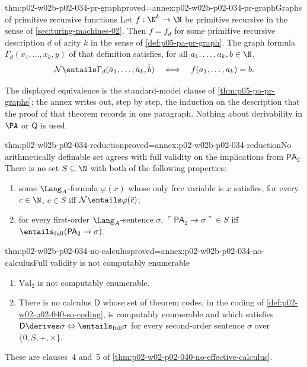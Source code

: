 \begin{hblemma}{thm:p02-w02b-p02-034-pr-graph}{proved=annex:p02-w02b-p02-034-pr-graph}{Graphs of primitive recursive functions}
Let \(f:\N^k\to\N\) be primitive recursive in the sense of
\cref{sec:turing-machines-02}.  Then \(f=f_d\) for some primitive recursive
description \(d\) of arity \(k\) in the sense of \cref{def:p05-pa-pr-graph}.
The graph formula \(\Gamma_d(x_1,\ldots,x_k,y)\) of that definition
satisfies, for all \(a_1,\ldots,a_k,b\in\N\),
\[
 \mathcal N\entails\Gamma_d(\bar a_1,\ldots,\bar a_k,\bar b)
 \quad\Longleftrightarrow\quad
 f(a_1,\ldots,a_k)=b.
\]
\end{hblemma}

The displayed equivalence is the standard-model clause of
\cref{thm:p05-pa-pr-graphs}; the annex writes out, step by step, the
induction on the description that the proof of that theorem records in one
paragraph.  Nothing about derivability in \(\PA\) or \(\mathsf Q\) is used.

\begin{hblemma}{thm:p02-w02b-p02-034-reduction}{proved=annex:p02-w02b-p02-034-reduction}{No arithmetically definable set agrees with full validity on the implications from \(\mathsf{PA}_2\)}
There is no set \(S\subseteq\N\) with both of the following properties:
\begin{enumerate}
 \item some \(\Lang_A\)-formula \(\varphi(x)\) whose only free variable is
   \(x\) satisfies, for every \(c\in\N\), \(c\in S\) iff
   \(\mathcal N\entails\varphi(\bar c)\);
 \item for every first-order \(\Lang_A\)-sentence \(\sigma\),
   \(\ulcorner\mathsf{PA}_2\to\sigma\urcorner\in S\) iff
   \(\entails_{\mathrm{full}}(\mathsf{PA}_2\to\sigma)\).
\end{enumerate}
\end{hblemma}

\begin{hbcorollary}{thm:p02-w02b-p02-034-no-calculus}{proved=annex:p02-w02b-p02-034-no-calculus}{Full validity is not computably enumerable}
\begin{enumerate}
 \item \(\mathrm{Val}_2\) is not computably enumerable.
 \item There is no calculus \(\mathsf D\) whose set of theorem codes, in the
   coding of \cref{def:p02-w02-p02-040-so-coding}, is computably enumerable
   and which satisfies
   \(\mathsf D\derives\sigma\Leftrightarrow\entails_{\mathrm{full}}\sigma\)
   for every second-order sentence \(\sigma\) over \(\{0,S,+,\times\}\).
\end{enumerate}
These are clauses~4 and~5 of
\cref{thm:p02-w02-p02-040-no-effective-calculus}.
\end{hbcorollary}

